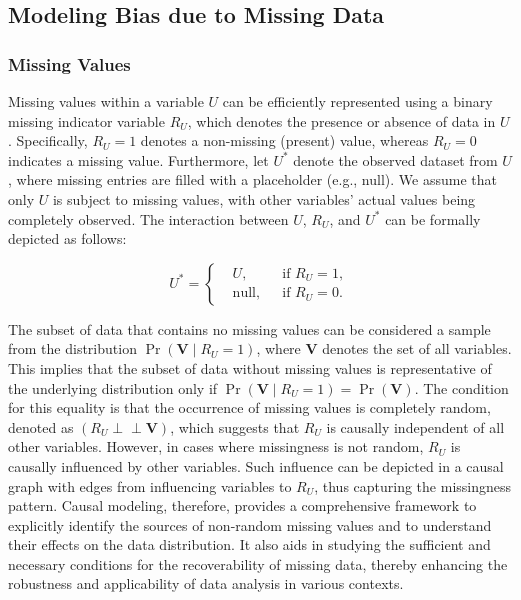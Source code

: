 \documentclass[11pt]{article}
\newcommand{\indep}{\mbox{$\perp\!\!\!\perp$}}
\begin{document}
\subsection{Modeling Bias due to Missing Data}
\subsubsection{Missing Values}

Missing values within a variable \(U\) can be efficiently represented using a binary missing indicator variable \(R_U\), which denotes the presence or absence of data in \(U\). Specifically, \(R_U = 1\) denotes a non-missing (present) value, whereas \(R_U = 0\) indicates a missing value. Furthermore, let \(U^*\) denote the observed dataset from \(U\), where missing entries are filled with a placeholder (e.g., null). We assume that only \(U\) is subject to missing values, with other variables' actual values being completely observed. The interaction between \(U\), \(R_U\), and \(U^*\) can be formally depicted as follows:

{\small
\[
U^* = \left\{
\begin{aligned}
&U, && \text{if } R_U = 1,\\
&\text{null}, && \text{if } R_U = 0.
\end{aligned}
\right.
\]
}

The subset of data that contains no missing values can be considered a sample from the distribution \(\Pr(\boldsymbol{V} \mid R_U = 1)\), where \(\boldsymbol{V}\) denotes the set of all variables. This implies that the subset of data without missing values is representative of the underlying distribution only if \(\Pr(\boldsymbol{V} \mid R_U = 1) = \Pr(\boldsymbol{V})\). The condition for this equality is that the occurrence of missing values is completely random, denoted as \((R_U \indep \boldsymbol{V})\), which suggests that \( R_U \) is causally independent of all other variables. However, in cases where missingness is not random, \( R_U \) is causally influenced by other variables. Such influence can be depicted in a causal graph with edges from influencing variables to \( R_U \), thus capturing the missingness pattern. Causal modeling, therefore, provides a comprehensive framework to explicitly identify the sources of non-random missing values and to understand their effects on the data distribution. It also aids in studying the sufficient and necessary conditions for the recoverability of missing data, thereby enhancing the robustness and applicability of data analysis in various contexts.
\end{document}
